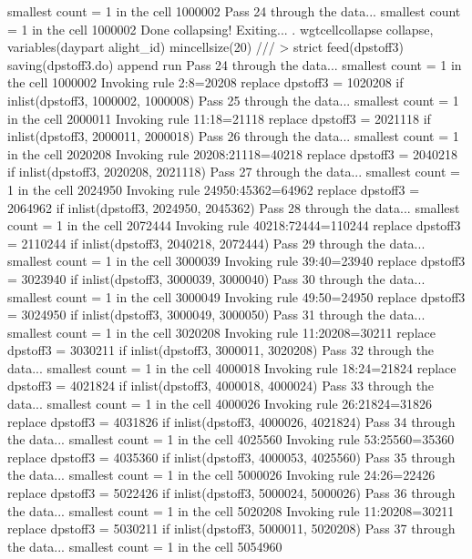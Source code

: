   smallest count = 1 in the cell      1000002
Pass 24 through the data...
  smallest count = 1 in the cell      1000002
  Done collapsing! Exiting...
{\smallskip}
. wgtcellcollapse collapse, variables(daypart alight_id) mincellsize(20) ///
>         strict feed(dpstoff3) saving(dpstoff3.do) append run
Pass 24 through the data...
  smallest count = 1 in the cell      1000002
  Invoking rule 2:8=20208
  replace dpstoff3 = 1020208 if inlist(dpstoff3, 1000002, 1000008)
Pass 25 through the data...
  smallest count = 1 in the cell      2000011
  Invoking rule 11:18=21118
  replace dpstoff3 = 2021118 if inlist(dpstoff3, 2000011, 2000018)
Pass 26 through the data...
  smallest count = 1 in the cell      2020208
  Invoking rule 20208:21118=40218
  replace dpstoff3 = 2040218 if inlist(dpstoff3, 2020208, 2021118)
Pass 27 through the data...
  smallest count = 1 in the cell      2024950
  Invoking rule 24950:45362=64962
  replace dpstoff3 = 2064962 if inlist(dpstoff3, 2024950, 2045362)
Pass 28 through the data...
  smallest count = 1 in the cell      2072444
  Invoking rule 40218:72444=110244
  replace dpstoff3 = 2110244 if inlist(dpstoff3, 2040218, 2072444)
Pass 29 through the data...
  smallest count = 1 in the cell      3000039
  Invoking rule 39:40=23940
  replace dpstoff3 = 3023940 if inlist(dpstoff3, 3000039, 3000040)
Pass 30 through the data...
  smallest count = 1 in the cell      3000049
  Invoking rule 49:50=24950
  replace dpstoff3 = 3024950 if inlist(dpstoff3, 3000049, 3000050)
Pass 31 through the data...
  smallest count = 1 in the cell      3020208
  Invoking rule 11:20208=30211
  replace dpstoff3 = 3030211 if inlist(dpstoff3, 3000011, 3020208)
Pass 32 through the data...
  smallest count = 1 in the cell      4000018
  Invoking rule 18:24=21824
  replace dpstoff3 = 4021824 if inlist(dpstoff3, 4000018, 4000024)
Pass 33 through the data...
  smallest count = 1 in the cell      4000026
  Invoking rule 26:21824=31826
  replace dpstoff3 = 4031826 if inlist(dpstoff3, 4000026, 4021824)
Pass 34 through the data...
  smallest count = 1 in the cell      4025560
  Invoking rule 53:25560=35360
  replace dpstoff3 = 4035360 if inlist(dpstoff3, 4000053, 4025560)
Pass 35 through the data...
  smallest count = 1 in the cell      5000026
  Invoking rule 24:26=22426
  replace dpstoff3 = 5022426 if inlist(dpstoff3, 5000024, 5000026)
Pass 36 through the data...
  smallest count = 1 in the cell      5020208
  Invoking rule 11:20208=30211
  replace dpstoff3 = 5030211 if inlist(dpstoff3, 5000011, 5020208)
Pass 37 through the data...
  smallest count = 1 in the cell      5054960
